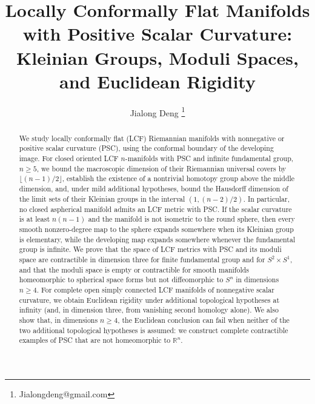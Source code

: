 \documentclass[12pt,oneside,a4paper]{article}
\theoremstyle{mytheorem}
\theoremstyle{remark}
\theoremstyle{definition}
\begin{document}
\title{Locally Conformally Flat Manifolds with Positive Scalar Curvature:
Kleinian Groups, Moduli Spaces, and Euclidean Rigidity}
\author{Jialong Deng \thanks{Jialongdeng@gmail.com}}
\date{}

\maketitle
\begin{abstract}
We study locally conformally flat (LCF) Riemannian manifolds with nonnegative or positive scalar curvature (PSC), using the conformal boundary of the developing image. For closed oriented LCF $n$-manifolds with PSC and infinite fundamental group, $n\ge5$, we bound the macroscopic dimension of their Riemannian universal covers by $\lfloor(n-1)/2\rfloor$, establish the existence of a nontrivial homotopy group above the middle dimension, and, under mild additional hypotheses, bound the Hausdorff dimension of the limit sets of their Kleinian groups in the interval $(1,(n-2)/2)$.
 In particular, no closed aspherical manifold admits an LCF metric with PSC. If the scalar curvature is at least $n(n-1)$ and the manifold is not isometric to the round sphere, then every smooth nonzero-degree map to the sphere expands somewhere when its Kleinian group is elementary, while the developing map expands somewhere whenever the fundamental group is infinite. We prove that the space of LCF metrics with PSC and its moduli space are contractible in dimension three for finite fundamental group and for $S^2\times S^1$, and that the moduli space is empty or contractible for smooth manifolds homeomorphic to spherical space forms but not diffeomorphic to $S^n$ in dimensions $n\ge4$. For complete open simply connected LCF manifolds of nonnegative scalar curvature, we obtain Euclidean rigidity under additional topological hypotheses at infinity (and, in dimension three, from vanishing second homology alone). We also show that, in dimensions $n\ge4$, the Euclidean conclusion can fail when neither of the two additional topological hypotheses is assumed: we construct complete contractible examples of PSC that are not homeomorphic to $\mathbb{R}^n$.


\end{abstract}


\tableofcontents
\end{document}
